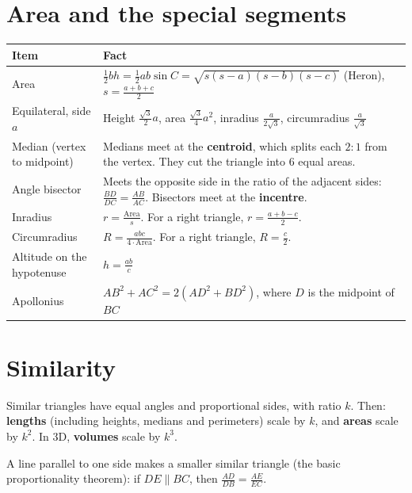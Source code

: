\documentclass[11pt,a4paper,openany]{report}
\begin{document}
\section{Area and the special segments}
\begin{center}\small
\begin{tabular}{>{\raggedright}p{5.3cm}>{\raggedright\arraybackslash}p{9cm}}
\toprule
Item & Fact\\\midrule
Area & $\frac12bh=\frac12ab\sin C=\sqrt{s(s-a)(s-b)(s-c)}$ (Heron), $s=\frac{a+b+c}2$\\
Equilateral, side $a$ & Height $\frac{\sqrt3}2a$, area $\frac{\sqrt3}4a^2$, inradius $\frac a{2\sqrt3}$, circumradius $\frac a{\sqrt3}$\\
Median (vertex to midpoint) & Medians meet at the \textbf{centroid}, which splits each $2:1$ from the vertex. They cut the triangle into 6 equal areas.\\
Angle bisector & Meets the opposite side in the ratio of the adjacent sides: $\frac{BD}{DC}=\frac{AB}{AC}$. Bisectors meet at the \textbf{incentre}.\\
Inradius & $r=\frac{\text{Area}}s$. For a right triangle, $r=\frac{a+b-c}2$.\\
Circumradius & $R=\frac{abc}{4\cdot\text{Area}}$. For a right triangle, $R=\frac c2$.\\
Altitude on the hypotenuse & $h=\frac{ab}c$\\
Apollonius & $AB^2+AC^2=2(AD^2+BD^2)$, where $D$ is the midpoint of $BC$\\
\bottomrule
\end{tabular}
\end{center}

\section{Similarity}
\begin{idea}[Scaling]
Similar triangles have equal angles and proportional sides, with ratio $k$. Then: \textbf{lengths} (including heights, medians and perimeters) scale by $k$, and \textbf{areas} scale by $k^2$. In 3D, \textbf{volumes} scale by $k^3$.

A line parallel to one side makes a smaller similar triangle (the basic proportionality theorem): if $DE\parallel BC$, then $\frac{AD}{DB}=\frac{AE}{EC}$.
\end{idea}
\end{document}

